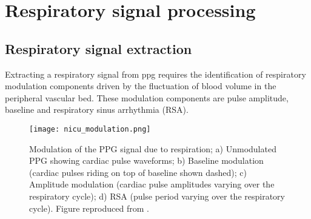 \section{Respiratory signal processing}

\subsection{Respiratory signal extraction }

Extracting a respiratory signal from \gls{ppg} requires the identification of respiratory modulation components driven by the fluctuation of blood volume in the peripheral vascular bed. These modulation components are pulse amplitude, baseline and respiratory sinus arrhythmia (RSA).

\begin{figure}
  \centering
    \texttt{[image: nicu\_modulation.png]}
    \caption[Modulation of the PPG signal due to respiration.]
    {
    Modulation of the PPG signal due to respiration; a) Unmodulated PPG showing cardiac pulse waveforms; b) Baseline modulation (cardiac pulses riding on top of baseline shown dashed); c) Amplitude modulation (cardiac pulse amplitudes varying over the respiratory cycle); d) RSA (pulse period varying over the respiratory cycle). Figure reproduced from \cite{addison2012developing}.
    }
	\label{modulation)}
\end{figure}

